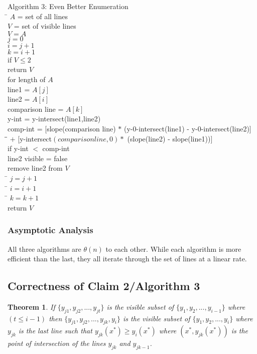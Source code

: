 \documentclass{article}
\newtheorem{theorem}{Theorem}
\begin{document}
\begin{tabbing}
  {\sc Algorithm 3: Even Better Enumeration}\\
  \qquad \= $A$ = set of all lines\\
  \> $V$ = set of visible lines \\
  \> $V = A$ \\
  \> $j = 0$\\
  \> $i = j + 1$\\
  \> $k = i + 1$\\
  \> if $V \leq 2$\\
  \> \qquad return $V$ \\
  \> for length of $A$\\
  \> \qquad line1 = $A[j]$\\
  \> \qquad line2 = $A[i]$\\
  \> \qquad comparison line = $A[k]$\\
  \> \qquad y-int = y-intersect(line1,line2)\\
  \> \qquad comp-int = [slope(comparison line) $*$ (y-0-intersect(line1) - y-0-intersect(line2)]\\
  \> \qquad \= \qquad \= $+$  [y-intersect$(comparison line,0) *$ (slope(line2) - slope(line1))]\\ 
  \> \qquad if y-int $<$ comp-int\\
  \> \qquad \qquad line2 visible = false\\
  \> \qquad \qquad remove line2 from $V$\\
  \> \qquad \= $j = j+1$\\
  \> \qquad \= $i = i+1$\\
  \> \qquad \= $k = k+1$\\
  \> return $V$\\
\end{tabbing}

\subsubsection*{Asymptotic Analysis}

All three algorithms are $\theta(n)$ to each other. While each algorithm is more efficient than the last, they all iterate through the set of lines at a linear rate. 

\subsection*{Correctness of Claim 2/Algorithm 3}

\begin{theorem}
  If \emph{$\{y_{j1},y_{j2},...,y_{jt}\}$} is the visible subset of \emph{$\{y_{1},y_{2},...,y_{i-1}\}$} where \emph{$(t \leq i-1)$} then $\{y_{j1},y_{j2},...,y_{jk},y_{i}\}$ is the visible subset of $\{y_{1},y_{2},...,y_{i}\}$ where $y_{jk}$ is the last line such that $y_{jk}(x^{*}) \geq y_{i}(x^{*})$ where $(x^{*},y_{jk}(x^{*}))$ is the point of intersection of the lines $y_{jk}$ and $y_{jk-1}$.
\end{theorem}
\end{document}

